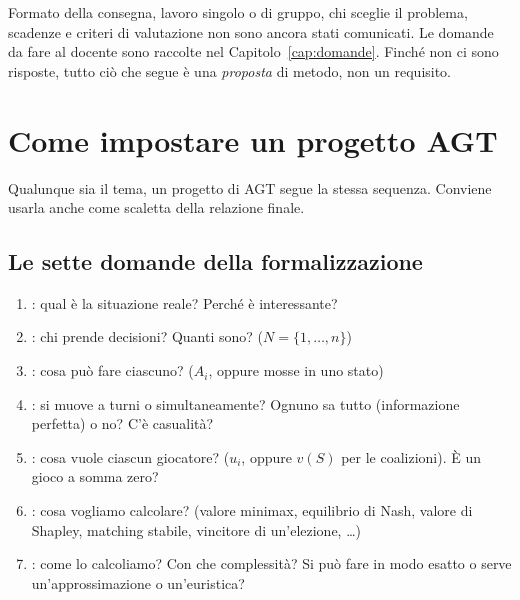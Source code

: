 \documentclass[11pt, a4paper, oneside, openany]{book}
\begin{document}
\begin{attenzione}
Formato della consegna, lavoro singolo o di gruppo, chi sceglie il problema, scadenze e
criteri di valutazione non sono ancora stati comunicati. Le domande da fare al docente sono
raccolte nel Capitolo~\ref{cap:domande}. Finché non ci sono risposte, tutto ciò che segue è
una \emph{proposta} di metodo, non un requisito.
\end{attenzione}

\chapter{Come impostare un progetto AGT}
\label{cap:metodo}

Qualunque sia il tema, un progetto di AGT segue la stessa sequenza. Conviene usarla anche
come scaletta della relazione finale.

\section{Le sette domande della formalizzazione}

\begin{enumerate}[label=\textbf{\arabic*.}, leftmargin=2em]
  \item {}: qual è la situazione reale? Perché è interessante?
  \item {}: chi prende decisioni? Quanti sono? ($N = \{1,\dots,n\}$)
  \item {}: cosa può fare ciascuno? ($A_i$, oppure mosse in uno stato)
  \item {}: si muove a turni o simultaneamente? Ognuno sa tutto
        (informazione perfetta) o no? C'è casualità?
  \item {}: cosa vuole ciascun giocatore? ($u_i$, oppure $v(S)$ per le coalizioni).
        È un gioco a somma zero?
  \item {}: cosa vogliamo calcolare? (valore minimax, equilibrio di
        Nash, valore di Shapley, matching stabile, vincitore di un'elezione, \ldots)
  \item {}: come lo calcoliamo? Con che complessità? Si può fare in modo esatto
        o serve un'approssimazione o un'euristica?
\end{enumerate}
\end{document}
